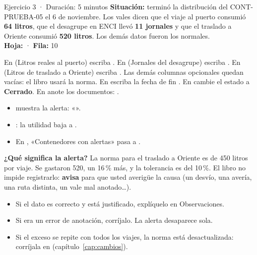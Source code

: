 \begin{ficha}{Ejercicio 3 · Duración: 5 minutos}
\textbf{Situación:} terminó la distribución del CONT-PRUEBA-05 el 6 de noviembre. Los vales dicen que el viaje al puerto consumió
\textbf{64 litros}, que el desagrupe en ENCI llevó \textbf{11 jornales} y que el traslado a Oriente consumió \textbf{520 litros}.
Los demás datos fueron los normales.\\
\textbf{Hoja:}  · \textbf{Fila:} 10
\end{ficha}

\begin{pasos}
\paso En  (Litros reales al puerto) escriba .
\paso En  (Jornales del desagrupe) escriba .
\paso En  (Litros de traslado a Oriente) escriba .
\paso Las demás columnas opcionales quedan vacías: el libro usará la norma.
\paso En  escriba la fecha de fin .
\paso En  cambie el estado a \textbf{Cerrado}.
\paso En  anote los documentos: .
\end{pasos}


\begin{resultado}
\begin{itemize}
  \item {}  muestra la alerta: «\textbf{\vEjTresAlerta}».
  \item {}: la utilidad baja a \textbf{\vEjTresUAI}.
  \item En , «Contenedores con alertas» pasa a \textbf{\vEjTresAlertas}.
\end{itemize}
\end{resultado}


\begin{nota}
\textbf{¿Qué significa la alerta?} La norma para el traslado a Oriente es de 450 litros por viaje. Se gastaron 520, un 16\,\% más, y la
tolerancia es del 10\,\%. El libro no impide registrarlo: \textbf{avisa} para que usted averigüe la causa (un desvío, una avería, una ruta
distinta, un vale mal anotado\dots).
\begin{itemize}
  \item Si el dato es correcto y está justificado, explíquelo en Observaciones.
  \item Si era un error de anotación, corríjalo. La alerta desaparece sola.
  \item Si el exceso se repite con todos los viajes, la norma está desactualizada: corríjala en  (capítulo~\ref{cap:cambios}).
\end{itemize}
\end{nota}

